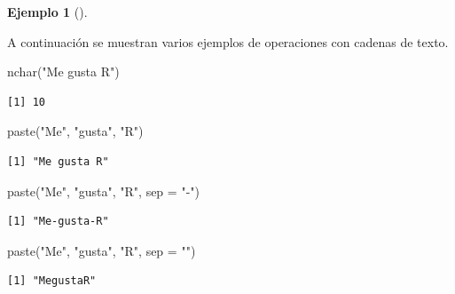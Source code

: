 \documentclass[
  a4paper,
]{scrreport}
\newenvironment{Shaded}{\begin{snugshade}}{\end{snugshade}}
\newcommand{\AttributeTok}[1]{\textcolor[rgb]{0.40,0.45,0.13}{#1}}
\newcommand{\FunctionTok}[1]{\textcolor[rgb]{0.28,0.35,0.67}{#1}}
\newcommand{\NormalTok}[1]{\textcolor[rgb]{0.00,0.23,0.31}{#1}}
\newcommand{\StringTok}[1]{\textcolor[rgb]{0.13,0.47,0.30}{#1}}
\theoremstyle{definition}
\newtheorem{example}{Ejemplo}[chapter]
\theoremstyle{definition}
\theoremstyle{remark}
\begin{document}
\leavevmode{}%
\begin{example}[]\label{exm-operaciones-cadenas}

A continuación se muestran varios ejemplos de operaciones con cadenas de
texto.

\begin{Shaded}
\begin{Highlighting}[]
\FunctionTok{nchar}\NormalTok{(}\StringTok{"Me gusta R"}\NormalTok{)}
\end{Highlighting}
\end{Shaded}

\begin{verbatim}
[1] 10
\end{verbatim}

\begin{Shaded}
\begin{Highlighting}[]
\FunctionTok{paste}\NormalTok{(}\StringTok{"Me"}\NormalTok{, }\StringTok{"gusta"}\NormalTok{, }\StringTok{"R"}\NormalTok{)}
\end{Highlighting}
\end{Shaded}

\begin{verbatim}
[1] "Me gusta R"
\end{verbatim}

\begin{Shaded}
\begin{Highlighting}[]
\FunctionTok{paste}\NormalTok{(}\StringTok{"Me"}\NormalTok{, }\StringTok{"gusta"}\NormalTok{, }\StringTok{"R"}\NormalTok{, }\AttributeTok{sep =} \StringTok{"{-}"}\NormalTok{)}
\end{Highlighting}
\end{Shaded}

\begin{verbatim}
[1] "Me-gusta-R"
\end{verbatim}

\begin{Shaded}
\begin{Highlighting}[]
\FunctionTok{paste}\NormalTok{(}\StringTok{"Me"}\NormalTok{, }\StringTok{"gusta"}\NormalTok{, }\StringTok{"R"}\NormalTok{, }\AttributeTok{sep =} \StringTok{""}\NormalTok{)}
\end{Highlighting}
\end{Shaded}

\begin{verbatim}
[1] "MegustaR"
\end{verbatim}


\end{example}
\end{document}
